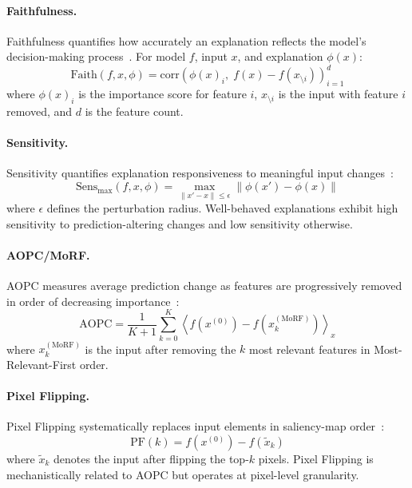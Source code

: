 \paragraph{Faithfulness.}
Faithfulness quantifies how accurately an explanation reflects the model's decision-making process~\cite{yeh2019fidelity}. For model $f$, input $x$, and explanation $\phi(x)$:
\begin{equation}
\text{Faith}(f, x, \phi) = \text{corr}\left(\phi(x)_i,\; f(x) - f(x_{\setminus i})\right)_{i=1}^{d}
\label{eq:faithfulness}
\end{equation}
where $\phi(x)_i$ is the importance score for feature $i$, $x_{\setminus i}$ is the input with feature $i$ removed, and $d$ is the feature count.

\paragraph{Sensitivity.}
Sensitivity quantifies explanation responsiveness to meaningful input changes~\cite{yeh2019fidelity}:
\begin{equation}
\text{Sens}_{\max}(f, x, \phi) = \max_{\|x' - x\| \leq \epsilon} \|\phi(x') - \phi(x)\|
\label{eq:sensitivity}
\end{equation}
where $\epsilon$ defines the perturbation radius. Well-behaved explanations exhibit high sensitivity to prediction-altering changes and low sensitivity otherwise.

\paragraph{AOPC/MoRF.}
AOPC measures average prediction change as features are progressively removed in order of decreasing importance~\cite{samek2017evaluating}:
\begin{equation}
\text{AOPC} = \frac{1}{K+1} \sum_{k=0}^{K} \left\langle f(x^{(0)}) - f(x^{(\text{MoRF})}_{k}) \right\rangle_{x}
\label{eq:aopc}
\end{equation}
where $x^{(\text{MoRF})}_{k}$ is the input after removing the $k$ most relevant features in Most-Relevant-First order.

\paragraph{Pixel Flipping.}
Pixel Flipping systematically replaces input elements in saliency-map order~\cite{samek2017evaluating}:
\begin{equation}
\text{PF}(k) = f(x^{(0)}) - f(\tilde{x}_{k})
\label{eq:pixel_flipping}
\end{equation}
where $\tilde{x}_{k}$ denotes the input after flipping the top-$k$ pixels. Pixel Flipping is mechanistically related to AOPC but operates at pixel-level granularity.

